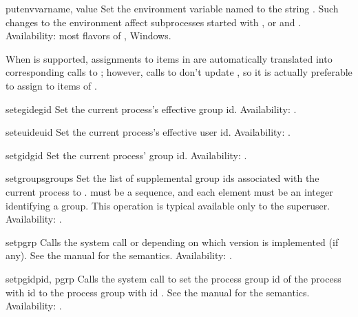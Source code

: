 \begin{funcdesc}{putenv}{varname, value}
Set the environment variable named  to the string
.  Such changes to the environment affect subprocesses
started with ,  or
 and .
Availability: most flavors of \UNIX, Windows.


When  is
supported, assignments to items in  are automatically
translated into corresponding calls to ; however,
calls to  don't update , so it is
actually preferable to assign to items of .
\end{funcdesc}

\begin{funcdesc}{setegid}{egid}
Set the current process's effective group id.
Availability: \UNIX.
\end{funcdesc}

\begin{funcdesc}{seteuid}{euid}
Set the current process's effective user id.
Availability: \UNIX.
\end{funcdesc}

\begin{funcdesc}{setgid}{gid}
Set the current process' group id.
Availability: \UNIX.
\end{funcdesc}

\begin{funcdesc}{setgroups}{groups}
Set the list of supplemental group ids associated with the current
process to .  must be a sequence, and each
element must be an integer identifying a group. This operation is
typical available only to the superuser.
Availability: \UNIX.
\end{funcdesc}

\begin{funcdesc}{setpgrp}{}
Calls the system call  or  depending on which version is implemented (if any).  See the
\UNIX{} manual for the semantics.
Availability: \UNIX.
\end{funcdesc}

\begin{funcdesc}{setpgid}{pid, pgrp} Calls the system call
 to set the process group id of the process with
id  to the process group with id .  See the \UNIX{}
manual for the semantics.
Availability: \UNIX.
\end{funcdesc}

